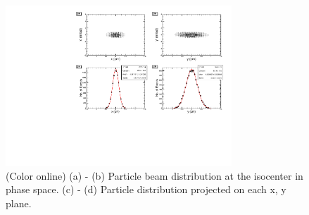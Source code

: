 \documentclass[jkps,preprint,fleqn,showpacs,showkeys,10pt,twocolumn]{revtex4}
\begin{document}
\begin{figure}[h]
  \begin{center}
    \includegraphics[width=8.5cm]{Fig04.pdf}
    \caption{(Color online) (a) - (b) Particle beam distribution at the isocenter in phase space. (c) - (d) Particle distribution projected on each x, y plane.}
    \label{fig3}
  \end{center}
\end{figure}
\end{document}
